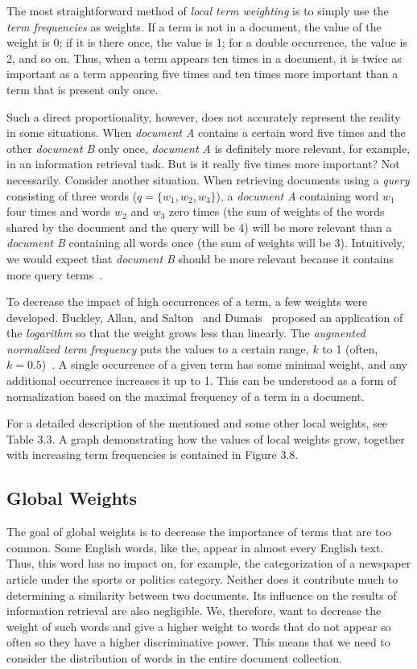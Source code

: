 The most straightforward method of \textit{local term weighting} is to simply use
the \textit{term frequencies} as weights. If a term is not in a document, the value of the
weight is 0; if it is there once, the value is 1; for a double occurrence, the value
is 2, and so on. Thus, when a term appears ten times in a document, it is twice
as important as a term appearing five times and ten times more important than a
term that is present only once.


Such a direct proportionality, however, does not accurately represent the reality in some situations. When \textit{document A} contains a certain word five times and the other \textit{document B} only once, \textit{document A} is definitely more relevant, for example, in an information retrieval task. But is it really five times more important? Not necessarily. Consider another situation. When retrieving documents using a \textit{query} consisting of three words (\(q=\{w_1,w_2,w_3\}\)), a \textit{document A} containing word \(w_1\) four times and words \(w_2\) and \(w_3\) zero times (the sum of weights of the words shared by the document and the query will be 4) will be more relevant than a \textit{document B} containing all words once (the sum of weights will be 3). Intuitively, we would expect that \textit{document B} should be more relevant because it contains more query terms~\cite{ref252}.

To decrease the impact of high occurrences of a term, a few weights were developed. Buckley, Allan, and Salton~\cite{ref41} and Dumais~\cite{ref77} proposed an application of the \textit{logarithm} so that the weight grows less than linearly. The \textit{augmented normalized term frequency} puts the values to a certain range, \(k\) to 1 (often, \(k = 0.5\))~\cite{ref235}. A single occurrence of a given term has some minimal weight, and any additional occurrence increases it up to 1. This can be understood as a form of normalization based on the maximal frequency of a term in a document.

For a detailed description of the mentioned and some other local weights, see
Table 3.3. A graph demonstrating how the values of local weights grow, together
with increasing term frequencies is contained in Figure 3.8.

\subsection{Global Weights}

The goal of global weights is to decrease the importance of terms that are too
common. Some English words, like the, appear in almost every English text.
Thus, this word has no impact on, for example, the categorization of a newspaper article under the sports or politics category. Neither does it contribute much
to determining a similarity between two documents. Its influence on the results
of information retrieval are also negligible. We, therefore, want to decrease the
weight of such words and give a higher weight to words that do not appear so
often so they have a higher discriminative power. This means that we need to
consider the distribution of words in the entire document collection.


